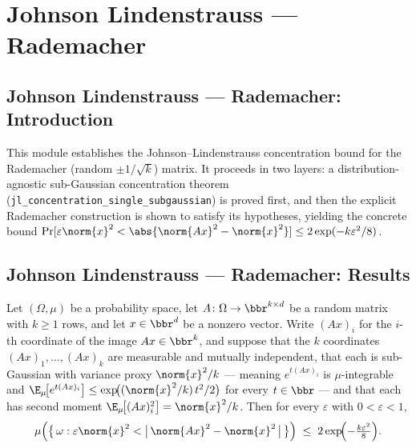 \section{Johnson Lindenstrauss --- Rademacher}
\subsection*{Johnson Lindenstrauss --- Rademacher: Introduction}

This module establishes the Johnson--Lindenstrauss concentration bound for the
Rademacher (random $\pm 1/\sqrt{k}$) matrix.  It proceeds in two layers: a
distribution-agnostic sub-Gaussian concentration theorem
(\texttt{jl\_concentration\_single\_subgaussian}) is proved first, and then the
explicit Rademacher construction is shown to satisfy its hypotheses, yielding the
concrete bound $\Pr[\varepsilon\norm{x}^2 < \abs{\norm{Ax}^2 - \norm{x}^2}] \leq
2\exp(-k\varepsilon^2/8)$.

\subsection*{Johnson Lindenstrauss --- Rademacher: Results}

\begin{theorem}
\label{jl_concentration_single_subgaussian}
\leanok
{}
Let $(\Omega,\mu)$ be a probability space, let $A\colon\Omega\to\bbr^{k\times d}$ be a
random matrix with $k\ge 1$ rows, and let $x\in\bbr^d$ be a nonzero vector. Write
$(Ax)_i$ for the $i$-th coordinate of the image $Ax\in\bbr^k$, and suppose that the $k$
coordinates $(Ax)_1,\dots,(Ax)_k$ are measurable and mutually independent, that each is
sub-Gaussian with variance proxy $\norm{x}^2/k$ — meaning $e^{t(Ax)_i}$ is
$\mu$-integrable and $\E_\mu\!\bigl[e^{t(Ax)_i}\bigr]\le
\exp\!\bigl((\norm{x}^2/k)\,t^2/2\bigr)$ for every $t\in\bbr$ — and that each has second
moment $\E_\mu\!\bigl[(Ax)_i^2\bigr]=\norm{x}^2/k$. Then for every $\varepsilon$ with
$0<\varepsilon<1$,
\[
\mu\!\left(\bigl\{\,\omega : \varepsilon\norm{x}^2 <
\bigl|\,\norm{Ax}^2-\norm{x}^2\,\bigr|\,\bigr\}\right)
  \;\le\; 2\exp\!\Bigl(-\tfrac{k\varepsilon^2}{8}\Bigr).
\]
\end{theorem}


